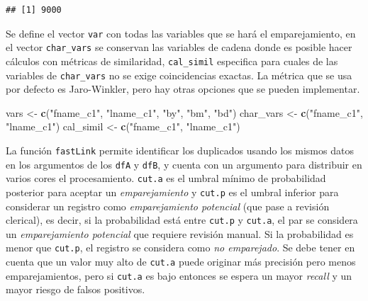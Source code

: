 \documentclass[
  12pt,
]{book}
\newenvironment{Shaded}{\begin{snugshade}}{\end{snugshade}}
\newcommand{\FunctionTok}[1]{\textcolor[rgb]{0.13,0.29,0.53}{\textbf{#1}}}
\newcommand{\NormalTok}[1]{#1}
\newcommand{\OtherTok}[1]{\textcolor[rgb]{0.56,0.35,0.01}{#1}}
\newcommand{\StringTok}[1]{\textcolor[rgb]{0.31,0.60,0.02}{#1}}
\begin{document}
\begin{verbatim}
## [1] 9000
\end{verbatim}

Se define el vector \texttt{var} con todas las variables que se hará el emparejamiento, en el vector \texttt{char\_vars} se conservan las variables de cadena donde es posible hacer cálculos con métricas de similaridad, \texttt{cal\_simil} especifica para cuales de las variables de \texttt{char\_vars} no se exige coincidencias exactas. La métrica que se usa por defecto es Jaro-Winkler, pero hay otras opciones que se pueden implementar.

\begin{Shaded}
\begin{Highlighting}[]
\NormalTok{vars }\OtherTok{\textless{}{-}} \FunctionTok{c}\NormalTok{(}\StringTok{"fname\_c1"}\NormalTok{, }\StringTok{"lname\_c1"}\NormalTok{, }\StringTok{"by"}\NormalTok{, }\StringTok{"bm"}\NormalTok{, }\StringTok{"bd"}\NormalTok{)}
\NormalTok{char\_vars }\OtherTok{\textless{}{-}} \FunctionTok{c}\NormalTok{(}\StringTok{"fname\_c1"}\NormalTok{, }\StringTok{"lname\_c1"}\NormalTok{)}
\NormalTok{cal\_simil }\OtherTok{\textless{}{-}} \FunctionTok{c}\NormalTok{(}\StringTok{"fname\_c1"}\NormalTok{, }\StringTok{"lname\_c1"}\NormalTok{)}
\end{Highlighting}
\end{Shaded}

La función \texttt{fastLink} permite identificar los duplicados usando los mismos datos en los argumentos de los \texttt{dfA} y \texttt{dfB}, y cuenta con un argumento para distribuir en varios cores el procesamiento. \texttt{cut.a} es el umbral mínimo de probabilidad posterior para aceptar un \emph{emparejamiento} y \texttt{cut.p} es el umbral inferior para considerar un registro como \emph{emparejamiento potencial} (que pase a revisión clerical), es decir, si la probabilidad está entre \texttt{cut.p} y \texttt{cut.a}, el par se considera un \emph{emparejamiento potencial} que requiere revisión manual. Si la probabilidad es menor que \texttt{cut.p}, el registro se considera como \emph{no emparejado}. Se debe tener en cuenta que un valor muy alto de \texttt{cut.a} puede originar más precisión pero menos emparejamientos, pero si \texttt{cut.a} es bajo entonces se espera un mayor \emph{recall} y un mayor riesgo de falsos positivos.
\end{document}

